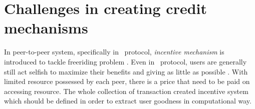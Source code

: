 
\section{Challenges in creating credit mechanisms}
In peer-to-peer system, specifically in \bt~protocol, \textit{incentive mechanism} is introduced to tackle freeriding problem \cite{2003:bittorrent:cohen}. Even in \bt~protocol, users are generally still act selfish to maximize their benefits and giving as little as possible \cite{2014:userbehaviourprivate:jia}. With limited resource possessed by each peer, there is a price that need to be paid on accessing resource. The whole collection of transaction created incentive system which should be defined in order to extract user goodness in computational way. 


